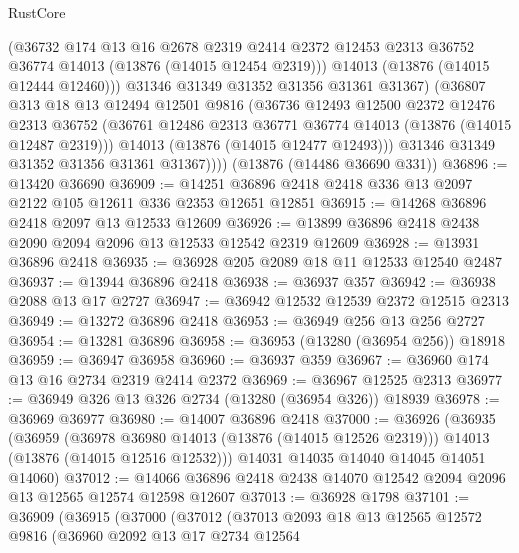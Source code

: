 \begin{lexlean}{RustCore}
\begin{coremodule}
              (@36732
                @174
                @13
                @16
                @2678
                @2319
                @2414
                @2372
                @12453
                @2313
                @36752
                @36774
                @14013
                (@13876 (@14015 @12454 @2319)))
              @14013
              (@13876 (@14015 @12444 @12460)))
            @31346
            @31349
            @31352
            @31356
            @31361
            @31367)
          (@36807
            @313
            @18
            @13
            @12494
            @12501
            @9816
            (@36736
              @12493
              @12500
              @2372
              @12476
              @2313
              @36752
              (@36761 @12486 @2313 @36771 @36774 @14013 (@13876 (@14015 @12487 @2319)))
              @14013
              (@13876 (@14015 @12477 @12493)))
            @31346
            @31349
            @31352
            @31356
            @31361
            @31367))))
    (@13876 (@14486 @36690 @331))
@36896 := @13420 @36690
@36909 := @14251 @36896 @2418 @2418 @336 @13 @2097 @2122 @105 @12611 @336 @2353 @12651 @12851
@36915 := @14268 @36896 @2418 @2097 @13 @12533 @12609
@36926 := @13899 @36896 @2418 @2438 @2090 @2094 @2096 @13 @12533 @12542 @2319 @12609
@36928 := @13931 @36896 @2418
@36935 := @36928 @205 @2089 @18 @11 @12533 @12540 @2487
@36937 := @13944 @36896 @2418
@36938 := @36937 @357
@36942 := @36938 @2088 @13 @17 @2727
@36947 := @36942 @12532 @12539 @2372 @12515 @2313
@36949 := @13272 @36896 @2418
@36953 := @36949 @256 @13 @256 @2727
@36954 := @13281 @36896
@36958 := @36953 (@13280 (@36954 @256)) @18918
@36959 := @36947 @36958
@36960 := @36937 @359
@36967 := @36960 @174 @13 @16 @2734 @2319 @2414 @2372
@36969 := @36967 @12525 @2313
@36977 := @36949 @326 @13 @326 @2734 (@13280 (@36954 @326)) @18939
@36978 := @36969 @36977
@36980 := @14007 @36896 @2418
@37000 := @36926
    (@36935
      (@36959
        (@36978 @36980 @14013 (@13876 (@14015 @12526 @2319)))
        @14013
        (@13876 (@14015 @12516 @12532)))
      @14031
      @14035
      @14040
      @14045
      @14051
      @14060)
@37012 := @14066 @36896 @2418 @2438 @14070 @12542 @2094 @2096 @13 @12565 @12574 @12598 @12607
@37013 := @36928 @1798
@37101 := @36909
    (@36915
      (@37000
        (@37012
          (@37013
            @2093
            @18
            @13
            @12565
            @12572
            @9816
            (@36960
              @2092
              @13
              @17
              @2734
              @12564

\end{coremodule}
\end{lexlean}
